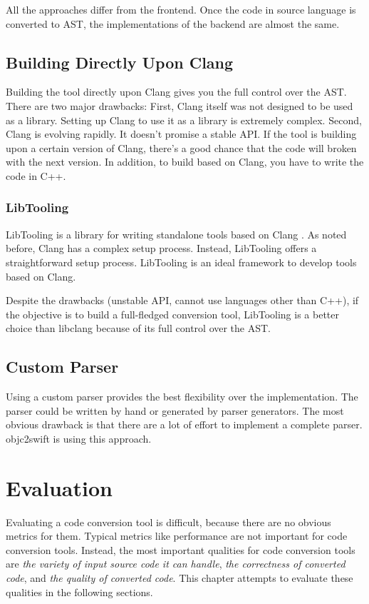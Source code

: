 \documentclass{sfuthesis}
\begin{document}
All the approaches differ from the frontend. Once the code in source language is converted to AST, the implementations of the backend are almost the same.

\section{Building Directly Upon Clang}

Building the tool directly upon Clang gives you the full control over the AST. There are two major drawbacks: First, Clang itself was not designed to be used as a library. Setting up Clang to use it as a library is extremely complex. Second, Clang is evolving rapidly. It doesn't promise a stable API. If the tool is building upon a certain version of Clang, there's a good chance that the code will broken with the next version. In addition, to build based on Clang, you have to write the code in C++.

\subsection{LibTooling}

LibTooling is a library for writing standalone tools based on Clang \cite{libtooling}. As noted before, Clang has a complex setup process. Instead, LibTooling offers a straightforward setup process. LibTooling is an ideal framework to develop tools based on Clang.

Despite the drawbacks (unstable API, cannot use languages other than C++), if the objective is to build a full-fledged conversion tool, LibTooling is a better choice than libclang because of its full control over the AST.

\section{Custom Parser}

Using a custom parser provides the best flexibility over the implementation. The parser could be written by hand or generated by parser generators. The most obvious drawback is that there are a lot of effort to implement a complete parser. objc2swift \cite{objc2swift} is using this approach.

\chapter{Evaluation}

Evaluating a code conversion tool is difficult, because there are no obvious metrics for them. Typical metrics like performance are not important for code conversion tools. Instead, the most important qualities for code conversion tools are \emph{the variety of input source code it can handle}, \emph{the correctness of converted code}, and \emph{the quality of converted code}. This chapter attempts to evaluate these qualities in the following sections.
\end{document}
